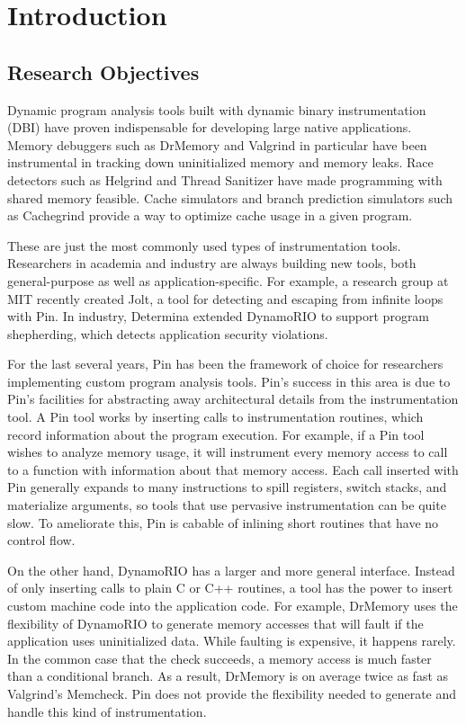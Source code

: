 \chapter{Introduction}

\section{Research Objectives}

Dynamic program analysis tools built with dynamic binary instrumentation (DBI)
have proven indispensable for developing large native applications.  Memory
debuggers such as DrMemory\cite{drmemory} and Valgrind\cite{valgrind} in
particular have been instrumental in tracking down uninitialized memory and
memory leaks.  Race detectors such as Helgrind\cite{helgrind} and Thread
Sanitizer\cite{tsan} have made programming with shared memory feasible.  Cache
simulators and branch prediction simulators such as
Cachegrind\cite{valgrind_workloads} provide a way to optimize cache usage in a
given program.

These are just the most commonly used types of instrumentation tools.
Researchers in academia and industry are always building new tools, both
general-purpose as well as application-specific.  For example, a research group
at MIT recently created Jolt\cite{jolt}, a tool for detecting and escaping from
infinite loops with Pin\cite{pin}.  In industry, Determina extended DynamoRIO
to support program shepherding\cite{shepherding}, which detects application
security violations.

For the last several years, Pin has been the framework of choice for researchers
implementing custom program analysis tools.  Pin's success in this area is due
to Pin's facilities for abstracting away architectural details from the
instrumentation tool.  A Pin tool works by inserting calls to instrumentation
routines, which record information about the program execution.  For example, if
a Pin tool wishes to analyze memory usage, it will instrument every memory
access to call to a function with information about that memory access.  Each
call inserted with Pin generally expands to many instructions to spill
registers, switch stacks, and materialize arguments, so tools that use pervasive
instrumentation can be quite slow.  To ameliorate this, Pin is cabable of
inlining short routines that have no control flow.

On the other hand, DynamoRIO\cite{bruening_phd} has a larger and more general
interface.  Instead of only inserting calls to plain C or C++ routines, a tool
has the power to insert custom machine code into the application code.  For
example, DrMemory uses the flexibility of DynamoRIO to generate memory accesses
that will fault if the application uses uninitialized data.  While faulting is
expensive, it happens rarely.  In the common case that the check succeeds, a
memory access is much faster than a conditional branch.  As a result, DrMemory
is on average twice as fast as Valgrind's Memcheck.\cite{drmemory}  Pin does not
provide the flexibility needed to generate and handle this kind of
instrumentation.

